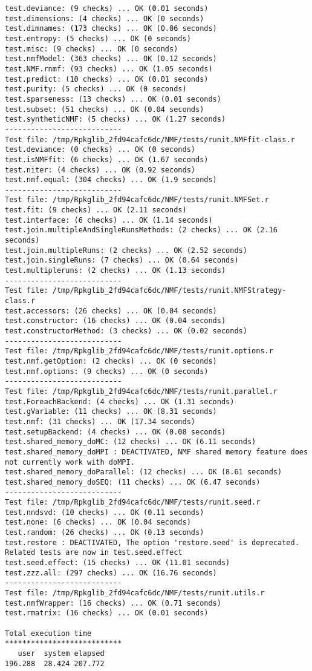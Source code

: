 \documentclass[10pt]{article}
\begin{document}
\begin{verbatim}
test.deviance: (9 checks) ... OK (0.01 seconds)
test.dimensions: (4 checks) ... OK (0 seconds)
test.dimnames: (173 checks) ... OK (0.06 seconds)
test.entropy: (5 checks) ... OK (0 seconds)
test.misc: (9 checks) ... OK (0 seconds)
test.nmfModel: (363 checks) ... OK (0.12 seconds)
test.NMF.rnmf: (93 checks) ... OK (1.05 seconds)
test.predict: (10 checks) ... OK (0.01 seconds)
test.purity: (5 checks) ... OK (0 seconds)
test.sparseness: (13 checks) ... OK (0.01 seconds)
test.subset: (51 checks) ... OK (0.04 seconds)
test.syntheticNMF: (5 checks) ... OK (1.27 seconds)
--------------------------- 
Test file: /tmp/Rpkglib_2fd94cafc6dc/NMF/tests/runit.NMFfit-class.r 
test.deviance: (0 checks) ... OK (0 seconds)
test.isNMFfit: (6 checks) ... OK (1.67 seconds)
test.niter: (4 checks) ... OK (0.92 seconds)
test.nmf.equal: (304 checks) ... OK (1.9 seconds)
--------------------------- 
Test file: /tmp/Rpkglib_2fd94cafc6dc/NMF/tests/runit.NMFSet.r 
test.fit: (9 checks) ... OK (2.11 seconds)
test.interface: (6 checks) ... OK (1.14 seconds)
test.join.multipleAndSingleRunsMethods: (2 checks) ... OK (2.16 seconds)
test.join.multipleRuns: (2 checks) ... OK (2.52 seconds)
test.join.singleRuns: (7 checks) ... OK (0.64 seconds)
test.multipleruns: (2 checks) ... OK (1.13 seconds)
--------------------------- 
Test file: /tmp/Rpkglib_2fd94cafc6dc/NMF/tests/runit.NMFStrategy-class.r 
test.accessors: (26 checks) ... OK (0.04 seconds)
test.constructor: (16 checks) ... OK (0.04 seconds)
test.constructorMethod: (3 checks) ... OK (0.02 seconds)
--------------------------- 
Test file: /tmp/Rpkglib_2fd94cafc6dc/NMF/tests/runit.options.r 
test.nmf.getOption: (2 checks) ... OK (0 seconds)
test.nmf.options: (9 checks) ... OK (0 seconds)
--------------------------- 
Test file: /tmp/Rpkglib_2fd94cafc6dc/NMF/tests/runit.parallel.r 
test.ForeachBackend: (4 checks) ... OK (1.31 seconds)
test.gVariable: (11 checks) ... OK (8.31 seconds)
test.nmf: (31 checks) ... OK (17.34 seconds)
test.setupBackend: (4 checks) ... OK (0.08 seconds)
test.shared_memory_doMC: (12 checks) ... OK (6.11 seconds)
test.shared_memory_doMPI : DEACTIVATED, NMF shared memory feature does not currently work with doMPI.
test.shared_memory_doParallel: (12 checks) ... OK (8.61 seconds)
test.shared_memory_doSEQ: (11 checks) ... OK (6.47 seconds)
--------------------------- 
Test file: /tmp/Rpkglib_2fd94cafc6dc/NMF/tests/runit.seed.r 
test.nndsvd: (10 checks) ... OK (0.11 seconds)
test.none: (6 checks) ... OK (0.04 seconds)
test.random: (26 checks) ... OK (0.13 seconds)
test.restore : DEACTIVATED, The option 'restore.seed' is deprecated. Related tests are now in test.seed.effect
test.seed.effect: (15 checks) ... OK (11.01 seconds)
test.zzz.all: (297 checks) ... OK (16.76 seconds)
--------------------------- 
Test file: /tmp/Rpkglib_2fd94cafc6dc/NMF/tests/runit.utils.r 
test.nmfWrapper: (16 checks) ... OK (0.71 seconds)
test.rmatrix: (16 checks) ... OK (0.01 seconds)

Total execution time
***************************
   user  system elapsed 
196.288  28.424 207.772 

\end{verbatim}
\end{document}
